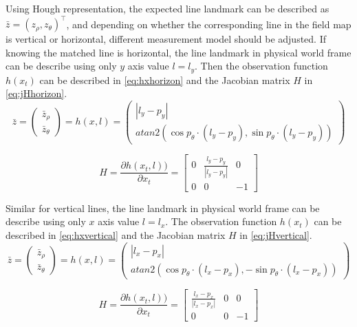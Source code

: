 Using Hough representation, the expected line landmark can be described as $\bar{z} = (z_{\rho}, z_{\theta})^\top$, and depending on whether the corresponding line in the field map is vertical or horizontal, different measurement model should be adjusted. If knowing the matched line is horizontal, the line landmark in physical world frame can be describe using only $y$ axis value $l = l_{y}$. Then the observation function $h(x_t)$ can be described in \autoref{eq:hxhorizon} and the Jacobian matrix $H$ in \autoref{eq:jHhorizon}. \\
\begin{equation}\label{eq:hxhorizon}
  \bar{z} = \begin{pmatrix}
\bar{z}_{\rho}\\ 
\bar{z}_{\theta}
\end{pmatrix}
= 
h(x, l)
=
\begin{pmatrix}
|l_{y}-p_{y}| \\
atan2(\cos{p_{\theta}\cdot (l_y-p_y)}, \sin{p_{\theta}}\cdot (l_y-p_y))
\end{pmatrix}
\end{equation}

\begin{equation}\label{eq:jHhorizon}
H =
\frac{\partial h(x_t,l))}{\partial x_t}
=
\begin{bmatrix}
  0 & \frac{l_{y}-p_{y}}{|l_{y}-p_{y}|} & 0 \\ 
  0 & 0 & -1 
\end{bmatrix}
\end{equation}

Similar for vertical lines, the line landmark in physical world frame can be describe using only $x$ axis value $l = l_{x}$. The observation function $h(x_t)$ can be described in \autoref{eq:hxvertical} and the Jacobian matrix $H$ in \autoref{eq:jHvertical}. \\
\begin{equation}\label{eq:hxvertical}
  \bar{z} = \begin{pmatrix}
\bar{z}_{\rho}\\ 
\bar{z}_{\theta}
\end{pmatrix}
= 
h(x, l)
=
\begin{pmatrix}
|l_{x}-p_{x}| \\
atan2(\cos{p_{\theta}\cdot (l_x-p_x)}, -\sin{p_{\theta}}\cdot (l_x-p_x))
\end{pmatrix}
\end{equation}

\begin{equation}\label{eq:jHvertical}
H =
\frac{\partial h(x_t,l))}{\partial x_t}
=
\begin{bmatrix}
  \frac{l_{x}-p_{x}}{|l_{x}-p_{x}|} & 0 & 0\\ 
  0 & 0 & -1 
\end{bmatrix}
\end{equation}

